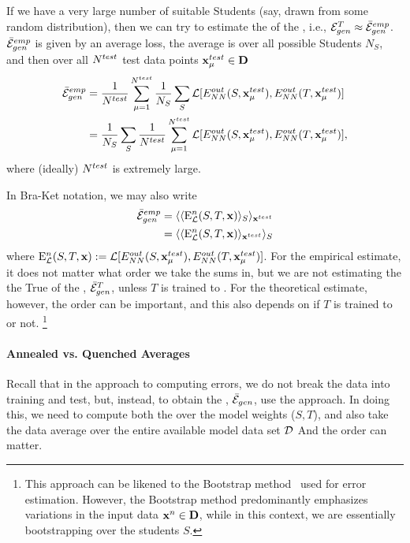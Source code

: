 If we have a very large number of suitable Students
(say, drawn from some random distribution), then we can try to estimate the 
\AverageGeneralizationError of the \Teacher, i.e., ${\mathcal{E}}_{gen}^{T}\approx\bar{\mathcal{E}}^{emp}_{gen}$.
$\bar{\mathcal{E}}^{emp}_{gen}$ is given by an average loss, the average is 
over all possible Students $N_S$,  and then  over all  $N^{test}$ test data points $\mathbf{x}_{\mu}^{test}\in\mathbf{D}$ 
\begin{align}
  \bar{\mathcal{E}}^{emp}_{gen}
  &=
  \frac{1}{N^{test}}\sum_{\mu=1}^{N^{test}}
  \frac{1}{N_S}\sum_{S}
  \mathcal{L}[E^{out}_{NN}(S,\mathbf{x}_{\mu}^{test}),E^{out}_{NN}(T,\mathbf{x}_{\mu}^{test})]  \\ \nonumber
    &=
  \frac{1}{N_S}\sum_{S}
    \frac{1}{N^{test}}\sum_{\mu=1}^{N^{test}}
    \mathcal{L}[E^{out}_{NN}(S,\mathbf{x}_{\mu}^{test}),E^{out}_{NN}(T,\mathbf{x}_{\mu}^{test})] ,
\label{eqn:emp_gen_error}
\end{align}
where (ideally) $N^{test}$ is extremely large.

In Bra-Ket notation, we may also write
\begin{align}
  \bar{\mathcal{E}}^{emp}_{gen}
  &= \langle \langle {\mathrm{E}}^{n}_{\mathcal{L}}(S,T,\mathbf{x}) \rangle_{S} \rangle_{\mathbf{x}^{test}}\\ \nonumber
  &= \langle \langle {\mathrm{E}}^{n}_{\mathcal{L}}(S,T,\mathbf{x}) \rangle_{\mathbf{x}^{test}} \rangle_{S}
\end{align}
where ${\mathrm{E}}^{n}_{\mathcal{L}}(S,T,\mathbf{x}):=\mathcal{L}[E^{out}_{NN}(S,\mathbf{x}_{\mu}^{test}),E^{out}_{NN}(T,\mathbf{x}_{\mu}^{test})]$.
For the empirical estimate, it does not matter what order we take the sums in,
but we are not estimating the
the True \AverageGeneralizationError  of the \Teacher, $\bar{\mathcal{E}}_{gen}^{T}$,
unless $T$ is trained to \Interpolation.
For the theoretical estimate, however, the order can be important, and this also depends on
if $T$ is trained to \Interpolation or not.
\footnote{This approach can be likened to the Bootstrap method~\cite{efron1993bootstrap} used for error estimation.  However, the Bootstrap method predominantly emphasizes variations in the input data $\mathbf{x}^{n}\in\mathbf{D}$, while in this context, we are essentially bootstrapping over the students $S$.}

\paragraph{Annealed vs. Quenched Averages}
Recall that in the \STATMECH approach to computing errors, we do not break the data into
training and test, but, instead, to obtain the \AverageGeneralizationError, $\bar{\mathcal{E}}_{gen}$, use
the \GeneratingFunction approach. In doing this, we need to compute both the \ThermalAverage
over the model weights ($S,T$), and also take the data average over the entire available model data set $\mathcal{D}$
And the order can matter.

